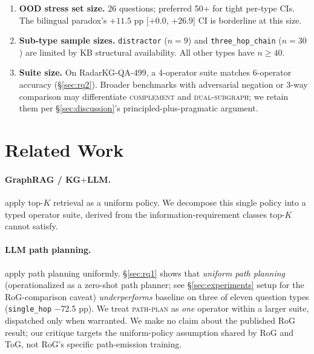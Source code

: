 \documentclass[review]{elsarticle}
\newcommand{\qtype}[1]{\texttt{\small #1}}
\newcommand{\op}[1]{\textsc{\small #1}}
\begin{document}
\begin{enumerate}[topsep=0pt,itemsep=2pt,leftmargin=*]
  \item \textbf{OOD stress set size.} 26 questions; preferred 50+ for tight per-type CIs. The bilingual paradox's $+11.5$ pp [$+0.0$, $+26.9$] CI is borderline at this size.
  \item \textbf{Sub-type sample sizes.} \qtype{distractor} ($n\!=\!9$) and \qtype{three\_hop\_chain} ($n\!=\!30$) are limited by KB structural availability. All other types have $n \geq 40$.
  \item \textbf{Suite size.} On RadarKG-QA-499, a 4-operator suite matches 6-operator accuracy (§\ref{sec:rq2}). Broader benchmarks with adversarial negation or 3-way comparison may differentiate \op{complement} and \op{dual-subgraph}; we retain them per §\ref{sec:discussion}'s principled-plus-pragmatic argument.
\end{enumerate}

\section{Related Work}
\label{sec:related}

\paragraph{GraphRAG / KG\texorpdfstring{$+$}{+}LLM.} \citet{edge2024graphrag,gutierrez2024hipporag,wang2024kgp,wen2024mindmap} apply top-$K$ retrieval as a uniform policy. We decompose this single policy into a typed operator suite, derived from the information-requirement classes top-$K$ cannot satisfy.

\paragraph{LLM path planning.} \citet{luo2024rog,sun2024tog,ma2025tog2} apply path planning uniformly. §\ref{sec:rq1} shows that \emph{uniform path planning} (operationalized as a zero-shot path planner; see §\ref{sec:experiments} setup for the RoG-comparison caveat) \emph{underperforms} baseline on three of eleven question types (\qtype{single\_hop} $-$72.5 pp). We treat \op{path-plan} as \emph{one} operator within a larger suite, dispatched only when warranted. We make no claim about the published RoG result; our critique targets the uniform-policy assumption shared by RoG and ToG, not RoG's specific path-emission training.
\end{document}
